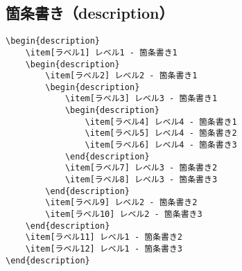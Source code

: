 \subsection{箇条書き（description）}

\begin{verbatim}
\begin{description}
    \item[ラベル1] レベル1 - 箇条書き1
    \begin{description}
        \item[ラベル2] レベル2 - 箇条書き1
        \begin{description}
            \item[ラベル3] レベル3 - 箇条書き1
            \begin{description}
                \item[ラベル4] レベル4 - 箇条書き1
                \item[ラベル5] レベル4 - 箇条書き2
                \item[ラベル6] レベル4 - 箇条書き3
            \end{description}
            \item[ラベル7] レベル3 - 箇条書き2
            \item[ラベル8] レベル3 - 箇条書き3
        \end{description}
        \item[ラベル9] レベル2 - 箇条書き2
        \item[ラベル10] レベル2 - 箇条書き3
    \end{description}
    \item[ラベル11] レベル1 - 箇条書き2
    \item[ラベル12] レベル1 - 箇条書き3
\end{description}
\end{verbatim}


